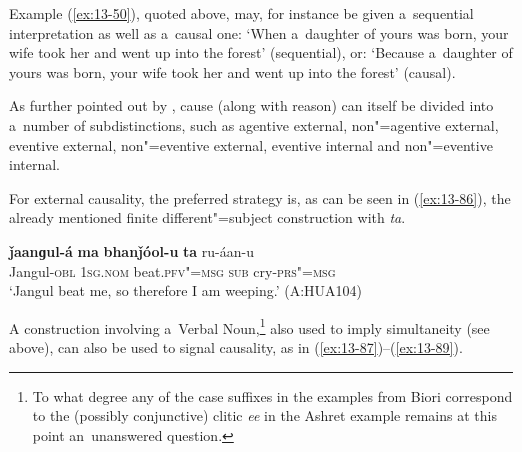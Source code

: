 Example (\ref{ex:13-50}), quoted above, may, for instance be given a~sequential interpretation as well as a~causal one: `When a~daughter of yours was born, your wife took her and went up into the forest' (sequential), or: `Because a~daughter of yours was born, your wife took her and went up into the forest' (causal).



As further pointed out by \citet[335]{givon2001b}, cause (along with reason) can itself be divided into a~number of subdistinctions, such as agentive external, non"=agentive external, eventive external, non"=eventive external, eventive internal and non"=eventive internal.



For external causality, the preferred strategy is, as can be seen in (\ref{ex:13-86}), the already mentioned finite different"=subject construction with \textit{ta}.

\begin{exe}
\ex
\label{ex:13-86}
\gll \textbf{ǰaanɡul-á} \textbf{ma} \textbf{bhanǰóol-u} \textbf{ta} ru-áan-u  \\
Jangul-\textsc{obl} \textsc{1sg.nom} beat.\textsc{pfv"=msg} \textsc{sub} cry-\textsc{prs"=msg}  \\
\glt `Jangul beat me, so therefore I am weeping.' (A:HUA104)
\end{exe}

A construction involving a~Verbal Noun,\footnote{To what degree any of the case suffixes in the examples from Biori correspond to the (possibly conjunctive) clitic \textit{ee} in the Ashret example remains at this point an~unanswered question.} also used to imply simultaneity (see above), can also be used to signal causality, as in (\ref{ex:13-87})--(\ref{ex:13-89}).

